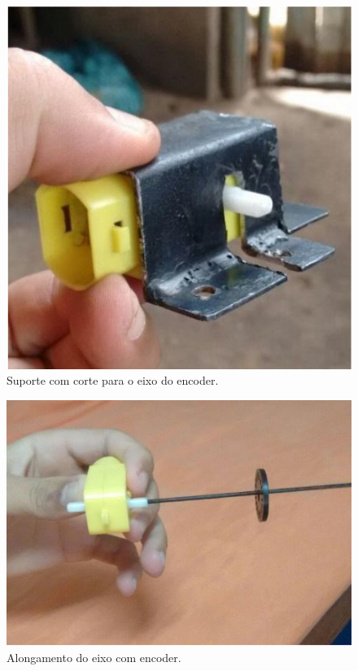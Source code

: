 \begin{itemize}
   		\begin{figure}[H]
            \centering
            \includegraphics[scale=0.5]{figuras/encoder1.png}
            \caption{Suporte com corte para o eixo do encoder.}
            \label{img:encoder1}
         \end{figure}

        \begin{figure}[H]
            \centering
            \includegraphics[scale=0.5]{figuras/eixoencoder.png}
            \caption{Alongamento do eixo com encoder.}
            \label{img:eixoencoder}
         \end{figure}


\end{itemize}
